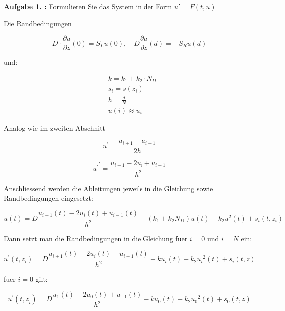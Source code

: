 \begin{mybox}
	\textbf{Aufgabe 1. :}	Formulieren Sie das System in der Form $ u' = F(t,u) $
\end{mybox}

Die Randbedingungen

\begin{equation}
	D\cdot \frac{\partial u}{\partial z}(0)=S_Lu(0),\quad D\frac{\partial u}{\partial z}(d)=-S_Ru(d)
\end{equation}

und:

\begin{align*}
	&k=k_1+k_2\cdot N_D\\
	&s_i=s(z_i)\\
	&h=\frac{d}{N}\\
	&u(i)\approx u_i
\end{align*}

Analog wie im zweiten Abschnitt

\begin{equation}
	u^{\prime } =\frac{u_{i+1} -u_{i-1} }{2h}
\end{equation}

\begin{equation}
	{u^{\prime } }^{\prime } =\frac{u_{i+1} -{2u}_i +u_{i-1} }{h^2 }
\end{equation}

Anschliessend werden die Ableitungen jeweils in die Gleichung sowie Randbedingungen eingesetzt:

\begin{equation}
	u\left(t\right)=D\frac{u_{i+1} \left(t\right)-{2u}_i \left(t\right)+u_{i-1} \left(t\right)}{h^2 }-\left(k_1 +k_2 N_D \right)u\left(t\right)-k_2 u^2 \left(t\right)+s_i \left(t,z_i \right)
\end{equation}

Dann setzt man die Randbedingungen in die Gleichung fuer $ i = 0 $ und $ i = N $ ein:

\begin{equation}
	u^{\prime } \left(t,z_i \right)=D\frac{u_{i+1} \left(t\right)-{2u}_i \left(t\right)+u_{i-1} \left(t\right)}{h^2 }-ku_i \left(t\right)-k_2 {u_i }^2 \left(t\right)+s_i \left(t,z\right)
\end{equation}

fuer $ i = 0 $ gilt:

\begin{equation}
	u^{\prime } \left(t{,z}_i \right)=D\frac{u_1 \left(t\right)-{2u}_0 \left(t\right)+u_{-1} \left(t\right)}{h^2 }-ku_0 \left(t\right)-k_2 {u_0 }^2 \left(t\right)+s_0 \left(t,z\right)
\end{equation}

